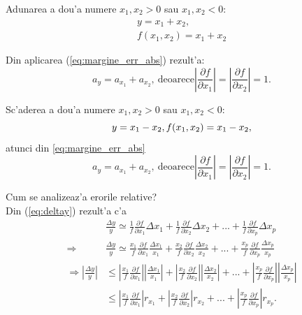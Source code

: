 \begin{example}[]
  Adunarea a dou'a numere $x_1, x_2 > 0$ sau $x_1, x_2 < 0$:
  \begin{align*}
    y = x_1 + x_2, \\
    f(x_1,x_2) = x_1 + x_2
  \end{align*}

Din aplicarea (\ref{eq:margine_err_abs}) rezult'a:
\begin{equation} 
a_y = a_{x_1} + a_{x_2},~\text{deoarece} \left|\frac{\partial f}{\partial x_1}\right| = \left|\frac{\partial f}{\partial x_2}\right| = 1.
\end{equation}
\end{example}
\begin{example}[]
Sc'aderea a dou'a numere $x_1, x_2 > 0$ sau $x_1, x_2 < 0$:
  \begin{equation*}
    y = x_1 - x_2,\\
    f(x_1,x_2) = x_1 - x_2,
  \end{equation*}
  atunci din \ref{eq:margine_err_abs}
\begin{equation} 
a_y = a_{x_1} + a_{x_2},~\text{deoarece} \left|\frac{\partial f}{\partial x_1}\right| = \left|\frac{\partial f}{\partial x_2}\right| = 1.
\end{equation}
\end{example}

\begin{definition}[]
  Cum se analizeaz'a erorile relative? \\
  Din (\ref{eq:deltay}) rezult'a c'a 
  \begin{align*}
    &\frac{\Delta y}{y} \simeq \frac{1}{f}\frac{\partial f}{\partial x_1}\Delta x_1 + \frac{1}{f}\frac{\partial f}{\partial x_2}\Delta x_2 + ... + \frac{1}{f}\frac{\partial f}{\partial x_p}\Delta x_p \\
    \Longrightarrow 
    &\frac{\Delta y}{y} \simeq \frac{x_1}{f}\frac{\partial f}{\partial x_1}\frac{\Delta x_1}{x_1} + \frac{x_2}{f}\frac{\partial f}{\partial x_2}\frac{\Delta x_2}{x_2} + ... + \frac{x_p}{f}\frac{\partial f}{\partial x_p}\frac{\Delta x_p}{x_p} \\
    \Longrightarrow 
    \left|\frac{\Delta y}{y}\right| &\leq \left|\frac{x_1}{f}\frac{\partial f}{\partial x_1}\right|\left|\frac{\Delta x_1}{x_1}\right| + \left|\frac{x_2}{f}\frac{\partial f}{\partial x_2}\right|\left|\frac{\Delta x_2}{x_2}\right| + ... + \left|\frac{x_p}{f}\frac{\partial f}{\partial x_p}\right|\left|\frac{\Delta x_p}{x_p}\right|\\
    &\leq \left|\frac{x_1}{f}\frac{\partial f}{\partial x_1}\right| r_{x_1} + \left|\frac{x_2}{f}\frac{\partial f}{\partial x_2}\right| r_{x_2} + ... + \left|\frac{x_p}{f}\frac{\partial f}{\partial x_p}\right| r_{x_p}.\\
  \end{align*}
\end{definition}

